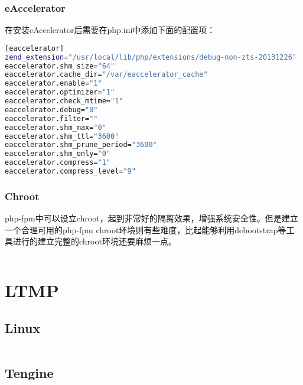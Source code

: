 \subsection{eAccelerator}

在安装eAccelerator后需要在php.ini中添加下面的配置项：

\begin{lstlisting}[language=bash]
[eaccelerator]
zend_extension="/usr/local/lib/php/extensions/debug-non-zts-20131226"
eaccelerator.shm_size="64"
eaccelerator.cache_dir="/var/eaccelerator_cache"
eaccelerator.enable="1"
eaccelerator.optimizer="1"
eaccelerator.check_mtime="1"
eaccelerator.debug="0"
eaccelerator.filter=""
eaccelerator.shm_max="0"
eaccelerator.shm_ttl="3600"
eaccelerator.shm_prune_period="3600"
eaccelerator.shm_only="0"
eaccelerator.compress="1"
eaccelerator.compress_level="9"
\end{lstlisting}




\subsection{Chroot}



php-fpm中可以设立chroot，起到非常好的隔离效果，增强系统安全性。但是建立一个合理可用的php-fpm chroot环境则有些难度，比起能够利用debootstrap等工具进行的建立完整的chroot环境还要麻烦一点。




\begin{lstlisting}[language=bash]

\end{lstlisting}





\chapter{LTMP}



\section{Linux}



\begin{lstlisting}[language=bash]

\end{lstlisting}


\section{Tengine}


